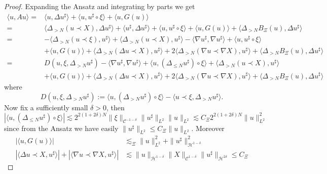 \documentclass[11pt, oneside]{article}   	%
\newcommand{\assign}{:=}
\newcommand{\CC}{\mathscr{C}}
\newcommand{\ssp}{\mathscr{H}}
\begin{document}
\begin{proof}
	Expanding the Ansatz and integrating by parts we get
	\begin{align*}
    \langle u, A u \rangle =& \langle u, \Delta u^{\sharp} \rangle + \langle
	u, u^{\sharp} \circ \xi \rangle + \langle u, G (u) \rangle\\ 
	 =& \langle \Delta_{> N} (u \prec X), \Delta u^{\sharp} \rangle + \langle
	u^{\sharp}, \Delta u^{\sharp} \rangle + \langle u, u^{\sharp} \circ \xi
	\rangle + \langle u, G (u) \rangle + \langle \Delta_{> N} B_{\Xi} (u),
	\Delta u^{\sharp} \rangle \\
	=& - \langle \Delta_{> N} (u \prec \xi), u^{\sharp} \rangle+\langle\Delta_{>N}(u\prec X),u^\sharp\rangle - \langle
	\nabla u^{\sharp}, \nabla u^{\sharp} \rangle + \langle u, u^{\sharp}
	\circ \xi \rangle \\
	& + \langle u, G (u) \rangle + \langle \Delta_{>N}(\Delta u \prec X), u^{\sharp} \rangle
	+ 2 \langle \Delta_{>N}(\nabla u \prec \nabla X), u^{\sharp} \rangle + \langle
	\Delta_{> N} B_{\Xi} (u), \Delta u^{\sharp} \rangle \\
	 =& D (u, \xi, \Delta_{> N} u^{\sharp}) - \langle \nabla u^{\sharp}, \nabla
	u^{\sharp} \rangle + \langle u, (\Delta_{\le N} u^{\sharp}) \circ
	\xi \rangle+\langle\Delta_{>N}(u\prec X),u^\sharp\rangle \\
	& + \langle u, G (u) \rangle + \langle \Delta_{>N}(\Delta u \prec X), u^{\sharp} \rangle
	+ 2 \langle \Delta_{>N}(\nabla u \prec \nabla X), u^{\sharp} \rangle + \langle
	\Delta_{> N} B_{\Xi} (u), \Delta u^{\sharp} \rangle 
	\end{align*}
	where
	\[ D (u, \xi, \Delta_{> N} u^{\sharp}) \assign \langle u, (\Delta_{> N}
	u^{\sharp}) \circ \xi \rangle - \langle u \prec \xi, \Delta_{> N}
	u^{\sharp} \rangle . \]
	Now fix a sufficiently small $\delta > 0$, then
	\[ | \langle u, (\Delta_{\le N} u^{\sharp}) \circ \xi \rangle |
	\lesssim 2^{2 (1 + 2 \delta) N} \| \xi \|_{\CC^{- 1 - \delta}} \|
	u^{\sharp} \|_{L^2} \| u \|_{L^2} \lesssim C_{\Xi} 2^{2 (1 + 2 \delta) N}
	\| u \|_{L^2}^2 \]
	since from the Ansatz we have easily $\| u^{\sharp} \|_{L^2} \le
	C_{\Xi} \| u \|_{L^2}$. Moreover
	\begin{align*}
	 | \langle u, G (u) \rangle | &\lesssim_{\Xi} \| u \|_{L^2}^2 + \|
	u^{\sharp} \|_{\ssp^{1 - \delta}}^2 \\
	 | \langle \Delta u \prec X, u^{\sharp} \rangle | + | \langle \nabla u
	\prec \nabla X, u^{\sharp} \rangle | &\lesssim \| u \|_{\ssp^{1 - \delta}} \|
	X \|_{\CC^{1 - \delta}} \| u^{\sharp} \|_{\ssp^{2 \delta}} \le C_{\Xi} 

\end{align*}
\end{proof}
\end{document}

